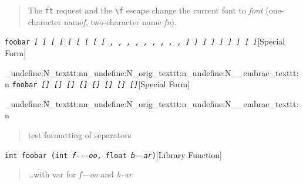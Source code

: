 \documentclass{book}
\begin{document}
%
\begin{quote}
\unskip{\parskip=0pt\noindent}%
The \texttt{ft} request and the \texttt{\textbackslash{}f} escape change the current font
to \textsl{font} (one-character name\hbox{}\textsl{f}, two-character name
\textsl{fn}).
\end{quote}

\noindent\texttt{foobar \EmbracOn{}\textnormal{\textsl{[ \EmbracOff{}\textnormal{[}\EmbracOn{} \textsl{[} \texttt{[} \texttt{[} \EmbracOff{}\textnormal{\textsl{[}}\EmbracOn{} \EmbracOff{}\textnormal{\texttt{[}}\EmbracOn{} \EmbracOff{}\textnormal{\texttt{\textsl{[}}}\EmbracOn{} \EmbracOff{}\textnormal{\texttt{[}}\EmbracOn{} , \EmbracOff{}\textnormal{,}\EmbracOn{} \textsl{,} \texttt{,} \texttt{,} \EmbracOff{}\textnormal{\textsl{,}}\EmbracOn{} \EmbracOff{}\textnormal{\texttt{,}}\EmbracOn{} \EmbracOff{}\textnormal{\texttt{\textsl{,}}}\EmbracOn{} \EmbracOff{}\textnormal{\texttt{,}}\EmbracOn{} ] \EmbracOff{}\textnormal{]}\EmbracOn{} \textsl{]} \texttt{]} \texttt{]} \EmbracOff{}\textnormal{\textsl{]}}\EmbracOn{} \EmbracOff{}\textnormal{\texttt{]}}\EmbracOn{} \EmbracOff{}\textnormal{\texttt{\textsl{]}}}\EmbracOn{} \EmbracOff{}\textnormal{\texttt{]}}\EmbracOn{}}}\EmbracOff{}}\hfill[Special Form]


\ExplSyntaxOn%
\cs_undefine:N{\embrac_texttt:nn}\cs_undefine:N{\embrac_orig_texttt:n}\cs_undefine:N{\__embrac_texttt:n}%
\ExplSyntaxOff%
%
\noindent\texttt{foobar \EmbracOn{}\textnormal{\textsl{[] \EmbracOff{}\textnormal{[]}\EmbracOn{} \textsl{[]} \texttt{[]} \texttt{[]} \EmbracOff{}\textnormal{\textsl{[]}}\EmbracOn{} \EmbracOff{}\textnormal{\texttt{[]}}\EmbracOn{} \EmbracOff{}\textnormal{\texttt{\textsl{[]}}}\EmbracOn{}}}\EmbracOff{}}\hfill[Special Form]


\ExplSyntaxOn%
\cs_undefine:N{\embrac_texttt:nn}\cs_undefine:N{\embrac_orig_texttt:n}\cs_undefine:N{\__embrac_texttt:n}%
\ExplSyntaxOff%
%
\begin{quote}
\unskip{\parskip=0pt\noindent}%
test formatting of separators
\end{quote}

\noindent\texttt{int foobar (int \textsl{f{-}{-}{-}oo}, float \textsl{b{-}{-}ar})}\hfill[Library Function]



%
\begin{quote}
\unskip{\parskip=0pt\noindent}%
\dots{}\@ with var for \textsl{f---oo} and \textsl{b--ar}
\end{quote}
\end{document}
